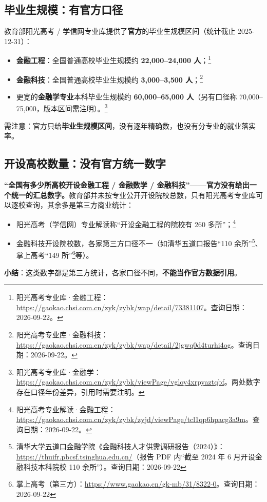 \documentclass[UTF8,11pt]{ctexart}
\begin{document}
\subsection{毕业生规模：有官方口径}

教育部阳光高考 / 学信网专业库提供了\textbf{官方}的毕业生规模区间（统计截止 2025-12-31）：
\begin{itemize}[itemsep=2pt]
\item \textbf{金融工程}：全国普通高校毕业生规模约 \textbf{22,000--24,000 人}；\footnote{阳光高考专业库·金融工程：\url{https://gaokao.chsi.com.cn/zyk/zybk/wap/detail/73381107}。查询日期：2026-09-22。}
\item \textbf{金融科技}：全国普通高校毕业生规模约 \textbf{3,000--3,500 人}；\footnote{阳光高考专业库·金融科技：\url{https://gaokao.chsi.com.cn/zyk/zybk/wap/detail/2jgwq0d4turhi4og}。查询日期：2026-09-22。}
\item 更宽的\textbf{金融学专业}本科毕业生规模约 \textbf{60,000--65,000 人}（另有口径称 70,000--75,000，版本区间需注明）。\footnote{阳光高考专业库·金融学：\url{https://gaokao.chsi.com.cn/zyk/zybk/viewPage/vgloy4xrpyaztqbf}。两处数字存在口径年份差异，引用时需要注明。}
\end{itemize}
需注意：官方只给\textbf{毕业生规模区间}，没有逐年精确数，也没有分专业的就业落实率。

\subsection{开设高校数量：没有官方统一数字}

\textbf{“全国有多少所高校开设金融工程 / 金融数学 / 金融科技”——官方没有给出一个统一的汇总数字。}教育部并未按专业公开开设院校总数，只有阳光高考专业库可以逐校查询，其余多是第三方商业统计：
\begin{itemize}[itemsep=2pt]
\item 阳光高考（学信网）专业解读称“开设金融工程的院校有 260 多所”；\footnote{阳光高考专业解读·金融工程：\url{https://gaokao.chsi.com.cn/zyk/zybk/zyjd/viewPage/tcl1qp6hpacg3a9m}。查询日期：2026-09-22。}
\item 金融科技开设院校数，各家第三方口径不一（如清华五道口报告“110 余所”\footnote{清华大学五道口金融学院《金融科技人才供需调研报告（2024）》：\url{https://thuifr.pbcsf.tsinghua.edu.cn/}（报告 PDF 内“截至 2024 年 6 月开设金融科技本科院校 110 余所”）。查询日期：2026-09-22}、掌上高考“149 所”\footnote{掌上高考（第三方）：\url{https://www.gaokao.cn/gk-mb/31/8322-0}。查询日期：2026-09-22}等）。
\end{itemize}
\textbf{小结}：这类数字都是第三方统计，各家口径不同，\textbf{不能当作官方数据引用}。
\end{document}
